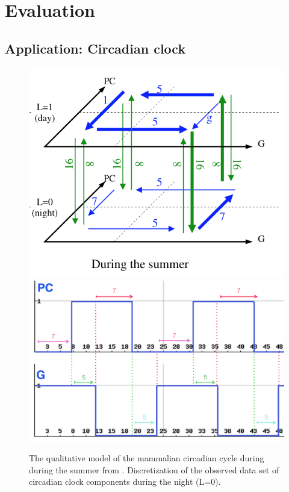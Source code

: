 \section{Evaluation}
\label{sec:evaluation}
\subsection{Application: Circadian clock}

\begin{figure}
\begin{center}
\includegraphics[width=0.4\linewidth]{images/circadianClock-summer.png}
\includegraphics[width=0.4\linewidth]{images/circadianClock-Courb.png}
\end{center}
\caption{The qualitative model of the mammalian circadian cycle during during the summer from \cite{comet2010formal}. Discretization of the observed data set of circadian clock components during the night (L=0).}
\end{figure}

